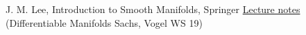 \documentclass[a4paper,11pt,titlepage, article, oneside]{memoir}
\numberwithin{equation}{section}
\theoremstyle{definition}
\theoremstyle{remark}
\begin{document}

\clearpage
\fancyhf{}
\begin{thebibliography}{AA}
J. M. Lee, Introduction to Smooth Manifolds, Springer
\href{https://www.physik.uni-muenchen.de/lehre/vorlesungen/wise_19_20/Differentiable-Manifolds/material/skript-TMP.pdf}{Lecture notes} (Differentiable Manifolds Sachs, Vogel WS 19)
\end{thebibliography}
\end{document}
